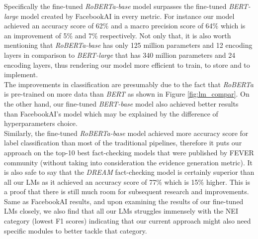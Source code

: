 \documentclass[conference]{IEEEtran}
\begin{document}
Specifically the fine-tuned \textit{RoBERTa-base} model surpasses the fine-tuned \textit{BERT-large} model created by FacebookAI in every metric. For instance our model achieved an accuracy score of 62\% and a macro precision score of 64\% which is an improvement of 5\% and 7\% respectively. Not only that, it is also worth mentioning that \textit{RoBERTa-base} has only 125 million parameters and 12 encoding layers in comparison to \textit{BERT-large} that has 340 million parameters and 24 encoding layers, thus rendering our model more efficient to train, to store and to implement.\\

The improvements in classification are presumably due to the fact that \textit{RoBERTa} is pre-trained on more data than \textit{BERT} as shown in Figure \ref{fig:lm_compar}. On the other hand, our fine-tuned \textit{BERT-base} model also achieved better results than FacebookAI's model which may be explained by the difference of hyperparameters choice.\\

Similarly, the fine-tuned \textit{RoBERTa-base} model achieved more accuracy score for label classification than most of the traditional pipelines, therefore it puts our approach on the top-10 best fact-checking models that were published by FEVER community\cite{thorne2018fact} (without taking into consideration the evidence generation metric). It is also safe to say that the \textit{DREAM} fact-checking model is certainly superior than all our LMs as it achieved an accuracy score of 77\% which is 15\% higher. This is a proof that there is still much room for subsequent research and improvements.\\

Same as FacebookAI results\cite{lee2020language}, and upon examining the results of our fine-tuned LMs closely, we also find that all our LMs struggles immensely with the NEI category (lowest F1 scores) indicating that our current approach might also need specific modules to better tackle that category.\\

\end{document}
